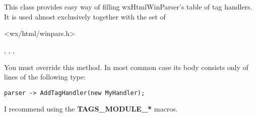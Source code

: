 %

\section{}\label{wxhtmltagsmodule}

This class provides easy way of filling wxHtmlWinParser's table of
tag handlers. It is used almost exclusively together with the set of




<wx/html/winpars.h>




,
,
,


\label{wxhtmltagsmodulefillhandlerstable}


You must override this method. In most common case its body consists
only of lines of the following type:

\begin{verbatim}
parser -> AddTagHandler(new MyHandler);
\end{verbatim}

I recommend using the {\bf TAGS\_MODULE\_*} macros.



